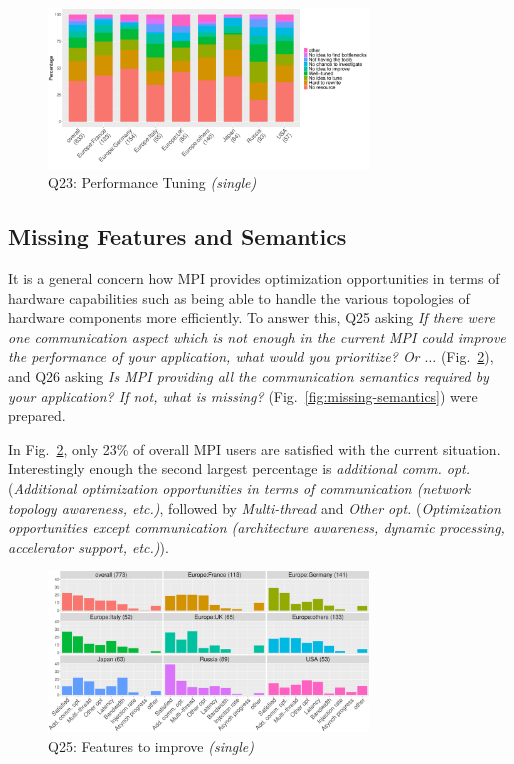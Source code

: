\documentclass[preprint,5p,times]{elsarticle}
\def\myquote#1{{\it #1}}
\begin{document}
\begin{figure}[htb]
\begin{center}
\includegraphics[width=8.5cm]{R-scripts/Q23.pdf}
\caption{Q23: Performance Tuning {\it(single)}}
\label{fig:tuning}
\end{center}
\end{figure}

\subsection{Missing Features and Semantics}

It is a general concern how MPI provides optimization
opportunities in terms of hardware capabilities such as being able to
handle the various topologies of hardware components more
efficiently. To answer this, Q25 asking \myquote{If there were one
communication aspect which is not enough in the current MPI could
improve the performance of your application, what would you
prioritize? Or $\ldots$} (Fig.~\ref{fig:missing-features}), and Q26 asking
\myquote{Is MPI providing all the communication semantics required by your
application? If not, what is missing?}
(Fig.~\ref{fig:missing-semantics}) were prepared.

In Fig.~\ref{fig:missing-features}, only 23\% of overall MPI users
are satisfied with the current situation.
Interestingly enough the second largest percentage is
\myquote{additional comm. opt.} (\myquote{Additional optimization
  opportunities in terms of communication (network topology awareness,
  etc.)}, followed by \myquote{Multi-thread} and \myquote{Other
  opt.} (\myquote{Optimization opportunities except communication
  (architecture awareness, dynamic processing, accelerator support,
  etc.)}).

\begin{figure}[htb]
\begin{center}
\includegraphics[width=8.5cm]{R-scripts/Q25.pdf}
\caption{Q25: Features to improve {\it(single)}}
\label{fig:missing-features}
\end{center}
\end{figure}
\end{document}

